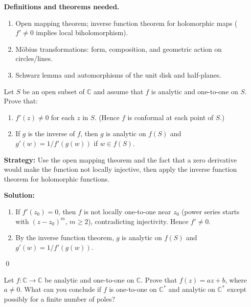\noindent\textbf{Definitions and theorems needed.}
\begin{enumerate}[label=(\alph*)]
\item Open mapping theorem; inverse function theorem for holomorphic maps ($f'\ne0$ implies local biholomorphism).
\item Möbius transformations: form, composition, and geometric action on circles/lines.
\item Schwarz lemma and automorphisms of the unit disk and half-planes.
\end{enumerate}



\begin{problembox}
\begin{problemstatement}
Let \( S \) be an open subset of \( \mathbb{C} \) and assume that \( f \) is analytic and one-to-one on \( S \). Prove that:
\begin{enumerate}[label=(\alph*)]
\item \( f'(z) \neq 0 \) for each \( z \) in \( S \). (Hence \( f \) is conformal at each point of \( S \).)
\item If \( g \) is the inverse of \( f \), then \( g \) is analytic on \( f(S) \) and \( g'(w) = 1 / f'(g(w)) \) if \( w \in f(S) \).
\end{enumerate}
\end{problemstatement}
\end{problembox}

\noindent\textbf{Strategy:} Use the open mapping theorem and the fact that a zero derivative would make the function not locally injective, then apply the inverse function theorem for holomorphic functions.

\bigskip\noindent\textbf{Solution:}
\begin{enumerate}[label=(\alph*)]
\item If $f'(z_0)=0$, then $f$ is not locally one-to-one near $z_0$ (power series starts with $(z-z_0)^m$, $m\ge2$), contradicting injectivity. Hence $f'\ne0$.
\item By the inverse function theorem, $g$ is analytic on $f(S)$ and $g'(w)=1/f'(g(w))$.
\end{enumerate}\qed


\begin{problembox}
\begin{problemstatement}
Let \( f : \mathbb{C} \to \mathbb{C} \) be analytic and one-to-one on \( \mathbb{C} \). Prove that \( f(z) = a z + b \), where \( a \neq 0 \). What can you conclude if \( f \) is one-to-one on \( \mathbb{C}^* \) and analytic on \( \mathbb{C}^* \) except possibly for a finite number of poles?
\end{problemstatement}
\end{problembox}

